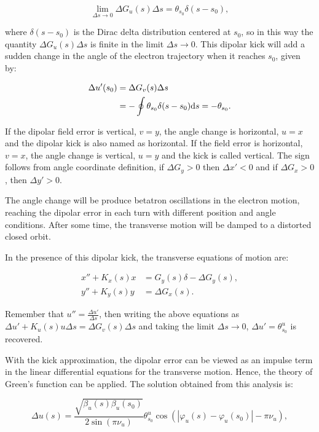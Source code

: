 \begin{equation*}
    \lim_{\Delta s \rightarrow 0}\Delta G_u(s)\Delta s = \theta_{s_0} \delta(s - s_0),
\end{equation*}

where $\delta(s-s_0)$ is the Dirac delta distribution centered at $s_0$, so in this way the quantity $\Delta G_u(s)\Delta s$ is finite in the limit $\Delta s \rightarrow 0$. This dipolar kick will add a sudden change in the angle of the electron trajectory when it reaches $s_0$, given by:

\begin{align*}
    \Delta u'(s_0) &= \Delta G_v(s) \Delta s \\
    &= -\oint \theta_{s_0} \delta(s - s_0) \mathrm{d} s = -\theta_{s_0}.
\end{align*}

If the dipolar field error is vertical, $v=y$, the angle change is horizontal, $u=x$ and the dipolar kick is also named as horizontal. If the field error is horizontal, $v=x$, the angle change is vertical, $u=y$ and the kick is called vertical. The sign follows from angle coordinate definition, if $\Delta G_y > 0$ then $\Delta x' < 0$ and if $\Delta G_x > 0$, then $\Delta y' > 0$.

The angle change will be produce betatron oscillations in the electron motion, reaching the dipolar error in each turn with different position and angle conditions. After some time, the transverse motion will be damped to a distorted closed orbit. 

In the presence of this dipolar kick, the transverse equations of motion  are:

\begin{align}
    x'' + K_x(s)x &= G_y(s) \delta - \Delta G_y(s), \\
    y'' + K_y(s)y &= \Delta G_x(s).
\end{align}

Remember that $u'' = \frac{\Delta u'}{\Delta s}$, then writing the above equations as $\Delta u' + K_u(s) u \Delta s = \Delta G_v(s) \Delta s$ and taking the limit $\Delta s \rightarrow 0$, $\Delta u' = \theta^{u}_{s_0}$ is recovered. 

With the kick approximation, the dipolar error can be viewed as an impulse term in the linear differential equations for the transverse motion. Hence, the theory of Green's function can be applied. The solution obtained from this analysis is:

\begin{equation}
    \Delta u(s) = \dfrac{\sqrt{\beta_{u}(s)\beta_{u}(s_0)}}{2\sin\left(\pi\nu_{u}\right)} \theta_{s_0}^{u} \cos\left( |\varphi_{u}(s) - \varphi_{u}(s_0)| - \pi\nu_{u} \right),
\end{equation}

